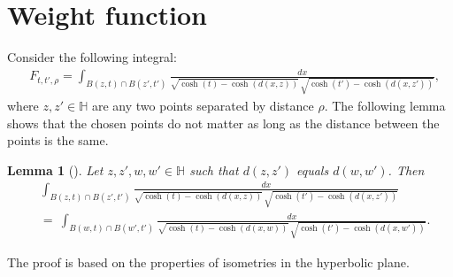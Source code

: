\documentclass[11pt,twoside,reqno]{amsart} \usepackage{a4wide} \usepackage[T1]{fontenc} \usepackage[utf8]{inputenc} \usepackage{soul}  \usepackage{amsmath} \usepackage{amsfonts} \usepackage{amssymb} \usepackage{mathtools} \usepackage{amsthm} \usepackage{xcolor} \usepackage{graphicx} \usepackage{hyperref} \usepackage{standalone} \usepackage{esint} \usepackage{comment} \usepackage[left=2.3cm,top=3cm,right=2.3cm]{geometry} \usepackage{bm} \usepackage{svg} \usepackage{float} \numberwithin{equation}{section} \theoremstyle{plain} \newtheorem{thm}{Theorem}[section] \newtheorem{theorem}[thm]{Theorem} \newtheorem*{theorem*}{Theorem}\newtheorem{conj}[thm]{Conjecture} \newtheorem{lemma}[thm]{Lemma} \newtheorem{prop}[thm]{Proposition} \newtheorem{proposition}[thm]{Proposition} \newtheorem{cor}[thm]{Corollary} \newtheorem{question}[thm]{Question} \newtheorem{corollary}[thm]{Corollary} \newtheorem{assumption}[thm]{Assumption} \theoremstyle{definition} \newtheorem{defn}[thm]{Definition} \newtheorem{choice}[thm]{Choice} \newtheorem{definition}[thm]{Definition} \newtheorem{ex}[thm]{Example} \newtheorem{notation}[thm]{Notation} \newtheorem*{ack}{Acknowledgements} \theoremstyle{remark} \newtheorem{remark}[thm]{Remark} \newtheorem{bigremark}[thm]{Remark} \usepackage{xcolor} \newcommand{\red}[1]{ {\color{Red}#1} } \newcommand{\blue}[1]{ {\color{Blue}#1} } \author{Kai Hippi} \address{Aalto University, Espoo, Finland} \email{kai.hippi@aalto.fi}
\begin{document}



\section{Weight function}

\label{Sec: Weight function}

\noindent
Consider the following integral:
\begin{align*}
	&
	F_{t,t',\rho} = \int_{ B( z,t ) \cap B( z', t' ) } \frac{dx}{ \sqrt{ \cosh( t ) - \cosh( d( x,z ) )  } \, \sqrt{ \cosh( t' ) - \cosh( d( x,z' ) ) } },
\end{align*}
where $ z,z' \in \mathbb{H} $ are any two points separated by distance $ \rho $. The following lemma shows that the chosen points do not matter as long as the distance between the points is the same.

\begin{lemma}[]
	\label{Lmm: Points do not matter}
	Let $ z,z', w, w' \in \mathbb{H} $ such that $ d( z,z' ) $ equals $ d( w,w' ) $. Then
	\begin{align}
		&
	     \nonumber
		\int_{ B( z,t ) \cap B( z', t' ) } \frac{dx}{ \sqrt{ \cosh( t ) - \cosh( d( x,z ) )  } \, \sqrt{ \cosh( t' ) - \cosh( d( x,z' ) ) } }	
	     \\ & = \ 
		\label{Expr: z z' integral}
		\int_{ B( w,t ) \cap B( w', t' ) } \frac{dx}{ \sqrt{ \cosh( t ) - \cosh( d( x,w ) )  } \, \sqrt{ \cosh( t' ) - \cosh( d( x,w' ) ) } }.
	\end{align}
		
\end{lemma}

The proof is based on the properties of isometries in the hyperbolic plane.
\end{document}
